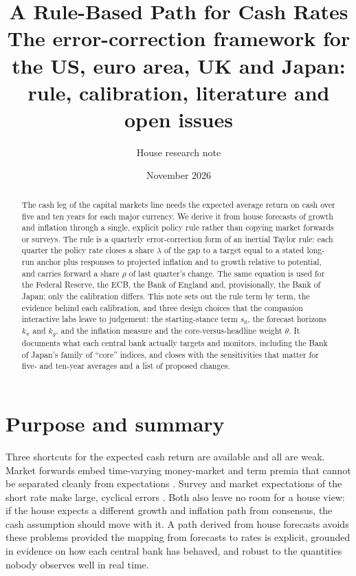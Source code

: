 \documentclass[11pt,a4paper]{article}
\title{A Rule-Based Path for Cash Rates\\[4pt]
\large The error-correction framework for the US, euro area, UK and Japan:\\ rule, calibration, literature and open issues}
\author{House research note}
\date{November 2026}
\begin{document}
\maketitle

\begin{abstract}
\noindent
The cash leg of the capital markets line needs the expected average return on cash over five and ten years for each major currency. We derive it from house forecasts of growth and inflation through a single, explicit policy rule rather than copying market forwards or surveys. The rule is a quarterly error-correction form of an inertial Taylor rule: each quarter the policy rate closes a share $\lambda$ of the gap to a target equal to a stated long-run anchor plus responses to projected inflation and to growth relative to potential, and carries forward a share $\rho$ of last quarter's change. The same equation is used for the Federal Reserve, the ECB, the Bank of England and, provisionally, the Bank of Japan; only the calibration differs. This note sets out the rule term by term, the evidence behind each calibration, and three design choices that the companion interactive labs leave to judgement: the starting-stance term $s_0$, the forecast horizons $k_\pi$ and $k_g$, and the inflation measure and the core-versus-headline weight $\theta$. It documents what each central bank actually targets and monitors, including the Bank of Japan's family of ``core'' indices, and closes with the sensitivities that matter for five- and ten-year averages and a list of proposed changes.
\end{abstract}

\tableofcontents

\section{Purpose and summary}
\label{sec:purpose}

Three shortcuts for the expected cash return are available and all are weak. Market forwards embed time-varying money-market and term premia that cannot be separated cleanly from expectations \parencite{ferrero2009}. Survey and market expectations of the short rate make large, cyclical errors \parencite{cieslak2018}. Both also leave no room for a house view: if the house expects a different growth and inflation path from consensus, the cash assumption should move with it. A path derived from house forecasts avoids these problems provided the mapping from forecasts to rates is explicit, grounded in evidence on how each central bank has behaved, and robust to the quantities nobody observes well in real time.
\end{document}
